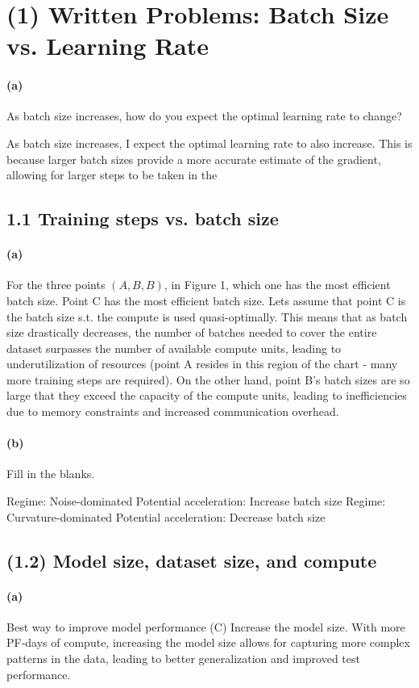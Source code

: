 \documentclass[12pt]{article}
\begin{document}
\psetheader %

\section*{(1) Written Problems: Batch Size vs. Learning Rate}
\paragraph{(a)}As batch size increases, how do you expect the optimal learning rate to change?

As batch size increases, I expect the optimal learning rate to also increase. This is because larger batch
sizes provide a more accurate estimate of the gradient, allowing for larger steps to be taken in the

\subsection*{1.1 Training steps vs. batch size}

\paragraph{(a)} For the three points $(A,B,B)$, in Figure 1, which one has the most efficient batch size.
Point C has the most efficient batch size. Lets assume that point C is the batch size s.t. the compute is
used quasi-optimally. This means that as batch size drastically decreases, the number of batches needed to
cover the entire dataset surpasses the number of available compute units, leading to underutilization of
resources (point A resides in this region of the chart - many more training steps are required). On the other
hand, point B's batch sizes are so large that they exceed the capacity of the compute units, leading to
inefficiencies due to memory constraints and increased communication overhead.

\paragraph{(b)} Fill in the blanks.

 Regime: Noise-dominated \quad Potential acceleration: Increase batch size
 Regime: Curvature-dominated \quad Potential acceleration: Decrease batch size

\subsection*{(1.2) Model size, dataset size, and compute}
\paragraph{(a)} Best way to improve model  performance
(C) Increase the model size. With more PF-days of compute, increasing the model size allows for capturing
more complex patterns in the data, leading to better generalization and improved test performance.
\end{document}
